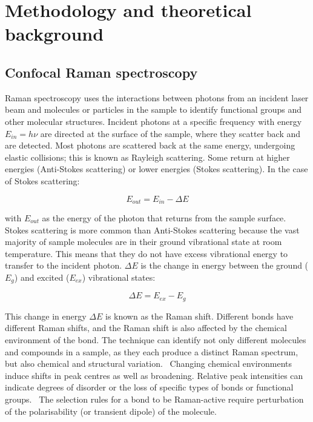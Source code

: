 


\section[Methodology and theoretical background]{Methodology and theoretical background}
\label{section1.2}

\subsection[Confocal Raman spectroscopy]{Confocal Raman spectroscopy}
\label{subsection1.2.1}

Raman spectroscopy uses the interactions between photons from an incident laser beam and molecules or particles in the sample to identify functional groups and other molecular structures. Incident photons at a specific frequency with energy $E_{in} = h\nu$ are directed at the surface of the sample, where they scatter back and are detected. Most photons are scattered back at the same energy, undergoing elastic collisions; this is known as Rayleigh scattering. Some return at higher energies (Anti-Stokes scattering) or lower energies (Stokes scattering). In the case of Stokes scattering:

\begin{equation} \label{eq:raman_1}
E_{out} = E_{in} - \Delta E
\end{equation}

with $E_{out}$ as the energy of the photon that returns from the sample surface. Stokes scattering is more common than Anti-Stokes scattering because the vast majority of sample molecules are in their ground vibrational state at room temperature. This means that they do not have excess vibrational energy to transfer to the incident photon. $\Delta E$ is the change in energy between the ground ($E_{g}$) and excited ($E_{ex}$) vibrational states:

\begin{equation} \label{eq:raman_2}
\Delta E = E_{ex} - E_{g}
\end{equation}

This change in energy $\Delta E$ is known as the Raman shift. Different bonds have different Raman shifts, and the Raman shift is also affected by the chemical environment of the bond. The technique can identify not only different molecules and compounds in a sample, as they each produce a distinct Raman spectrum, but also chemical and structural variation.~\autocite{2018RS,horiba,matousek_tissue} Changing chemical environments induce shifts in peak centres as well as broadening. Relative peak intensities can indicate degrees of disorder or the loss of specific types of bonds or functional groups.~\autocite{tomasini_raman} The selection rules for a bond to be Raman-active require perturbation of the polarisability (or transient dipole) of the molecule.~\autocite{2018RS,inphotonics}

